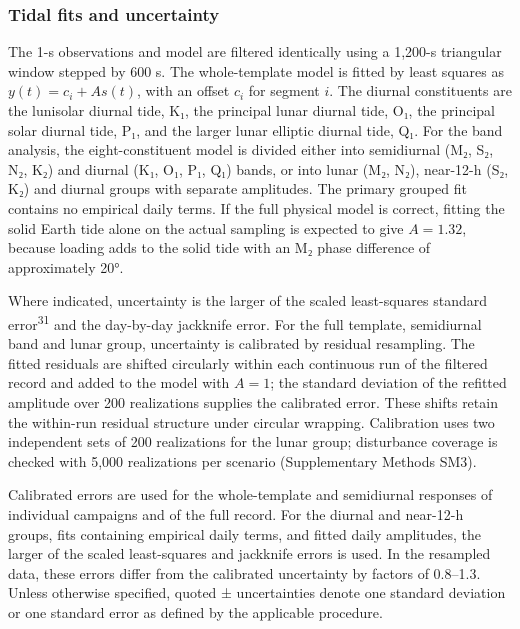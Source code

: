 \documentclass[
  11pt,
  a4paper,
]{article}
\begin{document}
\hypertarget{tidal-fits-and-uncertainty}{%
\subsubsection{Tidal fits and
uncertainty}\label{tidal-fits-and-uncertainty}}

The 1-s observations and model are filtered identically using a 1,200-s
triangular window stepped by 600 s. The whole-template model is fitted
by least squares as \(y(t)=c_i+A s(t)\), with an offset \(c_i\) for
segment \(i\). The diurnal constituents are the lunisolar diurnal tide,
K₁, the principal lunar diurnal tide, O₁, the principal solar diurnal
tide, P₁, and the larger lunar elliptic diurnal tide, Q₁. For the band
analysis, the eight-constituent model is divided either into semidiurnal
(M₂, S₂, N₂, K₂) and diurnal (K₁, O₁, P₁, Q₁) bands, or into lunar (M₂,
N₂), near-12-h (S₂, K₂) and diurnal groups with separate amplitudes. The
primary grouped fit contains no empirical daily terms. If the full
physical model is correct, fitting the solid Earth tide alone on the
actual sampling is expected to give \(A=1.32\), because loading adds to
the solid tide with an M₂ phase difference of approximately 20°.

Where indicated, uncertainty is the larger of the scaled least-squares
standard error\textsuperscript{31} and the day-by-day jackknife error.
For the full template, semidiurnal band and lunar group, uncertainty is
calibrated by residual resampling. The fitted residuals are shifted
circularly within each continuous run of the filtered record and added
to the model with \(A=1\); the standard deviation of the refitted
amplitude over 200 realizations supplies the calibrated error. These
shifts retain the within-run residual structure under circular wrapping.
Calibration uses two independent sets of 200 realizations for the lunar
group; disturbance coverage is checked with 5,000 realizations per
scenario (Supplementary Methods SM3).

Calibrated errors are used for the whole-template and semidiurnal
responses of individual campaigns and of the full record. For the
diurnal and near-12-h groups, fits containing empirical daily terms, and
fitted daily amplitudes, the larger of the scaled least-squares and
jackknife errors is used. In the resampled data, these errors differ
from the calibrated uncertainty by factors of 0.8--1.3. Unless otherwise
specified, quoted ± uncertainties denote one standard deviation or one
standard error as defined by the applicable procedure.
\end{document}
